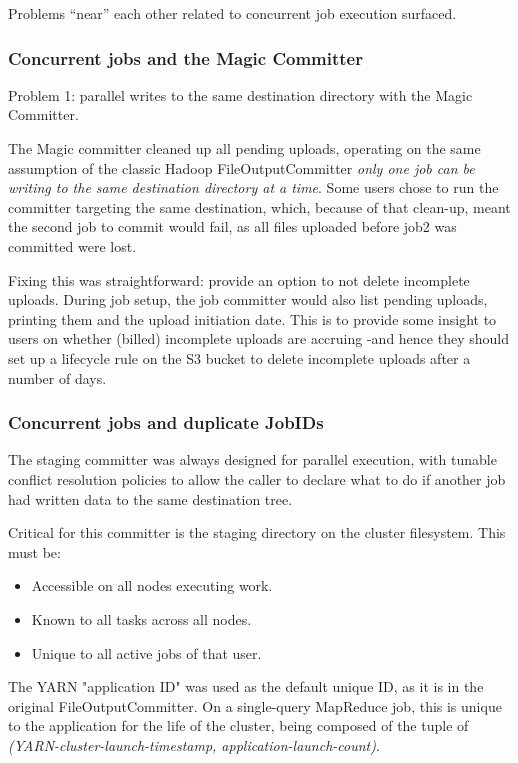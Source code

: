 \documentclass[conference]{IEEEtran}
\begin{document}
Problems ``near'' each other related to concurrent job execution surfaced.

\subsubsection{Concurrent jobs and the Magic Committer}

Problem 1: parallel writes to the same destination directory with the Magic Committer.

The Magic committer cleaned up all pending uploads,
operating on the same assumption of the classic Hadoop FileOutputCommitter
\emph{only one job can be writing to the same destination directory at a time}.
Some users chose to run the committer targeting the same destination, which,
because of that clean-up, meant the second job to commit would fail, as all
files uploaded before job2 was committed were lost.

Fixing this was straightforward: provide an option to not delete incomplete
uploads.
During job setup, the job committer would also list pending
uploads, printing them and the upload initiation date.
This is to provide some insight to users on whether (billed) incomplete uploads
are accruing -and hence they should set up a lifecycle rule on the S3 bucket
to delete incomplete uploads after a number of days.

\subsubsection{Concurrent jobs and duplicate JobIDs}

The staging committer was always designed for parallel execution,
with tunable conflict resolution policies to allow the caller to
declare what to do if another job had written data to the same
destination tree.

Critical for this committer is the staging directory on the cluster filesystem.
This must be:

\begin{itemize}
    \item Accessible on all nodes executing work.
    \item Known to all tasks across all nodes.
    \item Unique to all active jobs of that user.
\end{itemize}

The YARN "application ID" was used as the default unique ID, as it is in the original
FileOutputCommitter.
On a single-query MapReduce job, this is unique to the application
for the life of the cluster, being composed of the tuple of
\emph{(YARN-cluster-launch-timestamp, application-launch-count)}.
\end{document}

